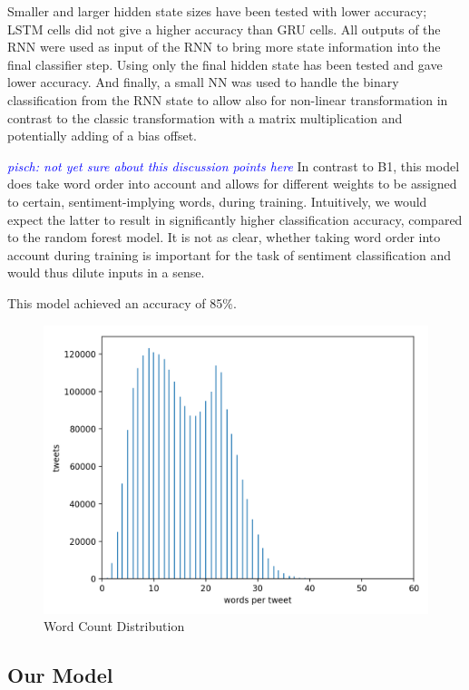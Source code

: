 \documentclass[10pt,conference,compsocconf]{IEEEtran}
\newcommand{\pisch}[1]{\textit{\textcolor{blue}{pisch: #1}}}
\begin{document}
Smaller and larger hidden state sizes have been tested with lower accuracy; LSTM cells did not give a higher accuracy than GRU cells.
All outputs of the RNN were used as input of the RNN to bring more state information into the final classifier step. Using only the final hidden state has been tested and gave lower accuracy.
And finally, a small NN was used to handle the binary classification from the RNN state to allow also for non-linear transformation in contrast to the classic transformation with a matrix multiplication and potentially adding of a bias offset.

\pisch{not yet sure about this discussion points here}
In contrast to B1, this model does take word order into account
and allows for different weights to be assigned to certain,
sentiment-implying words, during training. Intuitively, we would
expect the latter to result in significantly higher classification
accuracy, compared to the random forest model. It is not as clear,
whether taking word order into account during training is important
for the task of sentiment classification and would thus dilute inputs
in a sense.

This model achieved an accuracy of 85\%.

\begin{figure}[h!]
  \centering
  \includegraphics[scale=0.53]{word_count_histogram.png}
  \caption{Word Count Distribution}
  \label{fig:wordcount}
\end{figure}


\subsection{Our Model}
\end{document}
